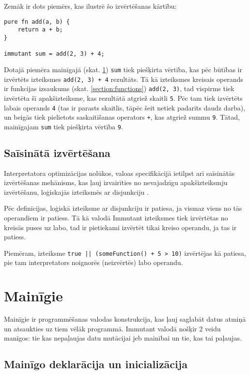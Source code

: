 \documentclass[12pt,a4paper]{report}
\begin{document}
Zemāk ir dots piemērs, kas ilustrē šo izvērtēšanas kārtību:

\begin{verbatim}
pure fn add(a, b) {
    return a + b;
}

immutant sum = add(2, 3) + 4;
\end{verbatim}

Dotajā piemēra mainīgajā (skat. \ref{section:vars}) \texttt{sum} tiek piešķirta vērtība, kas pēc būtības ir  izvērtēts izteiksmes \texttt{add(2, 3) + 4} rezultāts. Tā kā izteiksmes kreisais operands ir funkcijas izsaukums (skat. \ref{section:functions}) \texttt{add(2, 3)}, tad vispirms tiek izvērtēta šī apakšizteiksme, kas rezultātā atgriež skaitli \texttt{5}. Pēc tam tiek izvērtēts labais operands \texttt{4} (tas ir parasts skaitlis, tāpēc šeit netiek padarīts daudz darba), un beigās tiek pielietots saskaitīšanas operators \texttt{+}, kas atgriež summu \texttt{9}. Tātad, mainīgajam \texttt{sum} tiek piešķirta vērtība \texttt{9}.

\subsection{Saīsinātā izvērtēšana}

Interpretatora optimizācijas nolūkos, valoas specifikācijā ietilpst arī saīsinātās izvērtēšanas mehānisms, kas ļauj izvairīties no nevajadzīgu apakšizteiksmju izvērtēšanu, loģiskajās izteiksmēs ar disjunkciju \cite{short-circuit-logic}.

Pēc definīcijas, loģiskā izteiksme ar disjunkciju ir patiesa, ja vismaz viens no tās operandiem ir patiess.
Tā kā valodā Immutant izteiksmes tiek izvērtētas no kreisās puses uz labo, tad ir pietiekami izvērtēt tikai kreiso operandu, ja tas ir patiess.

Piemēram, izteiksme \texttt{true || (someFunction() + 5 > 10)} izvērtējas kā patiesa, pie tam interpretators noignorēs (neizvērtēs) labo operandu.

\section{Mainīgie}
\label{section:vars}

Mainīgie ir programmēšanas valodas konstrukcija, kas ļauj saglabāt datus atmiņā un atsaukties uz tiem vēlāk programmā. Immutant valodā nošķir 2 veidu manīgos: tie kas nepaļaujas datu mutācijai jeb mainībai un tie, kas tai paļaujas. 

\subsection{Mainīgo deklarācija un inicializācija}
\end{document}
